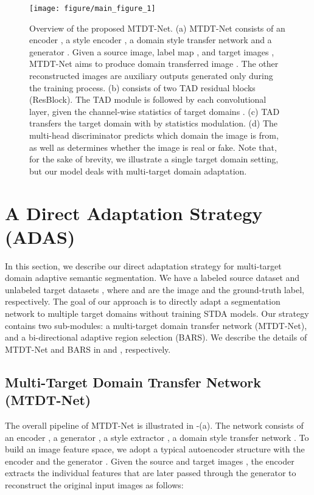 \begin{figure*}[t] 
	\centering
    \texttt{[image: figure/main\_figure\_1]}
	\vspace{-2mm}
\caption{Overview of the proposed MTDT-Net.
	(a) MTDT-Net consists of an encoder , a style encoder , a domain style transfer network  and a generator . Given a source image, label map , and target images , MTDT-Net aims to produce domain transferred image .
	The other reconstructed images  are auxiliary outputs generated only during the training process.
	(b)  consists of two TAD residual blocks (ResBlock). The TAD module is followed by each convolutional layer, given the channel-wise statistics of target domains .
	(c) TAD transfers the target domain with  by statistics modulation.
	(d) The multi-head discriminator predicts which domain the image is from, as well as determines whether the image is real or fake.
	Note that, for the sake of brevity, we illustrate a single target domain setting, but our model deals with multi-target domain adaptation.
	}
	\label{fig:overview}
	\vspace{-3mm}
\end{figure*}

\section{A Direct Adaptation Strategy (ADAS)}
\label{sec:method}

In this section, we describe our direct adaptation strategy for multi-target domain adaptive semantic segmentation.
We have a labeled source dataset  and  unlabeled target datasets , where  and  are the image and the ground-truth label, respectively.
The goal of our approach is to directly adapt a segmentation network  to multiple target domains without training STDA models.
Our strategy contains two sub-modules: a multi-target domain transfer network (MTDT-Net), and a bi-directional adaptive region selection (BARS).
We describe the details of MTDT-Net and BARS in  and , respectively.


\subsection{Multi-Target Domain Transfer Network (MTDT-Net)}
\label{sec:MTDT-Net}
The overall pipeline of MTDT-Net is illustrated in -(a).
The network consists of an encoder , a generator , a style extractor , a domain style transfer network .
To build an image feature space, we adopt a typical autoencoder structure with the encoder  and the generator .
Given the source and target images , the encoder  extracts the individual features  that are later passed through the generator  to reconstruct the original input images  as follows:


